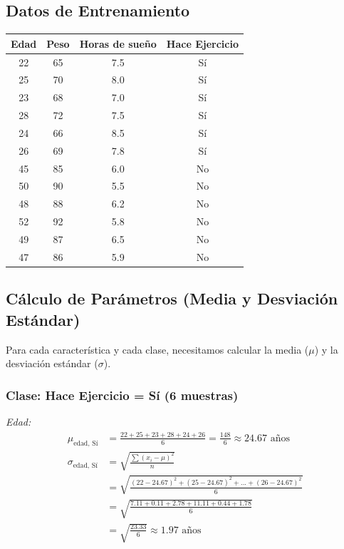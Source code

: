 \documentclass[12pt]{article}
\begin{document}
\subsection{Datos de Entrenamiento}
\begin{table}[H]
    \centering
    \begin{tabular}{cccc}
        \toprule
        Edad & Peso & Horas de sueño & Hace Ejercicio \\
        \midrule
        22 & 65 & 7.5 & Sí \\
        25 & 70 & 8.0 & Sí \\
        23 & 68 & 7.0 & Sí \\
        28 & 72 & 7.5 & Sí \\
        24 & 66 & 8.5 & Sí \\
        26 & 69 & 7.8 & Sí \\
        45 & 85 & 6.0 & No \\
        50 & 90 & 5.5 & No \\
        48 & 88 & 6.2 & No \\
        52 & 92 & 5.8 & No \\
        49 & 87 & 6.5 & No \\
        47 & 86 & 5.9 & No \\
        \bottomrule
    \end{tabular}
\end{table}

\subsection{Cálculo de Parámetros (Media y Desviación Estándar)}
Para cada característica y cada clase, necesitamos calcular la media ($\mu$) y la desviación estándar ($\sigma$).

\subsubsection{Clase: Hace Ejercicio = Sí (6 muestras)}

\textit{Edad:}
\begin{align*}
\mu_{\text{edad, Sí}} &= \frac{22 + 25 + 23 + 28 + 24 + 26}{6} = \frac{148}{6} \approx 24.67 \text{ años} \\
\sigma_{\text{edad, Sí}} &= \sqrt{\frac{\sum (x_i - \mu)^2}{n}} \\
&= \sqrt{\frac{(22-24.67)^2 + (25-24.67)^2 + ... + (26-24.67)^2}{6}} \\
&= \sqrt{\frac{7.11 + 0.11 + 2.78 + 11.11 + 0.44 + 1.78}{6}} \\
&= \sqrt{\frac{23.33}{6}} \approx 1.97 \text{ años}
\end{align*}
\end{document}
